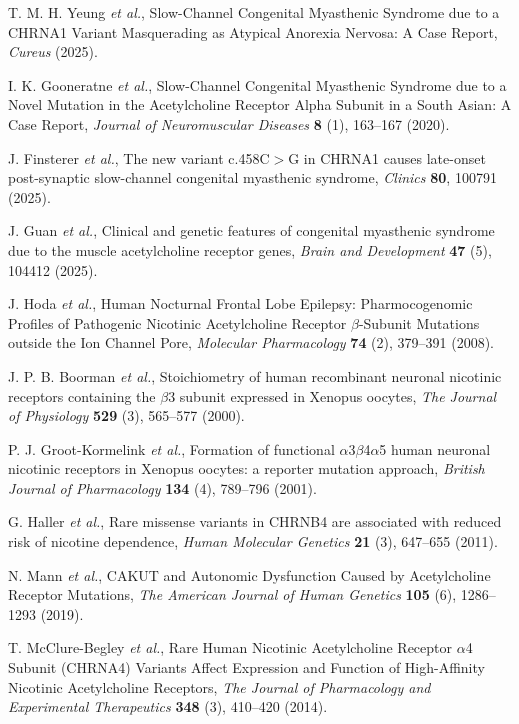 T. M. H. Yeung {\em et al.}, Slow-Channel Congenital Myasthenic Syndrome due to a CHRNA1 Variant Masquerading as Atypical Anorexia Nervosa: A Case Report, {\em Cureus} (2025).

I. K. Gooneratne {\em et al.}, Slow-Channel Congenital Myasthenic Syndrome due to a Novel Mutation in the Acetylcholine Receptor Alpha Subunit in a South Asian: A Case Report, {\em Journal of Neuromuscular Diseases} {\bf 8} (1), 163--167 (2020).

J. Finsterer {\em et al.}, The new variant c.458C$>$G in CHRNA1 causes late-onset post-synaptic slow-channel congenital myasthenic syndrome, {\em Clinics} {\bf 80}, 100791 (2025).

J. Guan {\em et al.}, Clinical and genetic features of congenital myasthenic syndrome due to the muscle acetylcholine receptor genes, {\em Brain and Development} {\bf 47} (5), 104412 (2025).

J. Hoda {\em et al.}, Human Nocturnal Frontal Lobe Epilepsy: Pharmocogenomic Profiles of Pathogenic Nicotinic Acetylcholine Receptor $\beta$-Subunit Mutations outside the Ion Channel Pore, {\em Molecular Pharmacology} {\bf 74} (2), 379--391 (2008).

J. P. B. Boorman {\em et al.}, Stoichiometry of human recombinant neuronal nicotinic receptors containing the $\beta$3 subunit expressed in Xenopus oocytes, {\em The Journal of Physiology} {\bf 529} (3), 565--577 (2000).

P. J. Groot-Kormelink {\em et al.}, Formation of functional $\alpha$3$\beta$4$\alpha$5 human neuronal nicotinic receptors in Xenopus oocytes: a reporter mutation approach, {\em British Journal of Pharmacology} {\bf 134} (4), 789--796 (2001).

G. Haller {\em et al.}, Rare missense variants in CHRNB4 are associated with reduced risk of nicotine dependence, {\em Human Molecular Genetics} {\bf 21} (3), 647--655 (2011).

N. Mann {\em et al.}, CAKUT and Autonomic Dysfunction Caused by Acetylcholine Receptor Mutations, {\em The American Journal of Human Genetics} {\bf 105} (6), 1286--1293 (2019).

T. McClure-Begley {\em et al.}, Rare Human Nicotinic Acetylcholine Receptor $\alpha$4 Subunit (CHRNA4) Variants Affect Expression and Function of High-Affinity Nicotinic Acetylcholine Receptors, {\em The Journal of Pharmacology and Experimental Therapeutics} {\bf 348} (3), 410--420 (2014).


